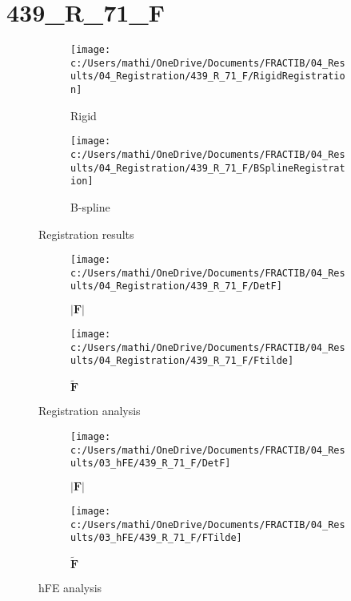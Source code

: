 \documentclass{article}%
\begin{document}
%
\newpage%
\section*{439\_R\_71\_F}%
\label{sec:439R71F}%


\begin{figure}[h!]%
\begin{subfigure}[b]{0.5\linewidth}%
\texttt{[image: c:/Users/mathi/OneDrive/Documents/FRACTIB/04\_Results/04\_Registration/439\_R\_71\_F/RigidRegistration]}%
\caption{Rigid}%
\end{subfigure}%
\begin{subfigure}[b]{0.5\linewidth}%
\texttt{[image: c:/Users/mathi/OneDrive/Documents/FRACTIB/04\_Results/04\_Registration/439\_R\_71\_F/BSplineRegistration]}%
\caption{B{-}spline}%
\end{subfigure}%
\caption{Registration results}%
\end{figure}

%


\begin{figure}[h!]%
\begin{subfigure}[b]{0.5\linewidth}%
\texttt{[image: c:/Users/mathi/OneDrive/Documents/FRACTIB/04\_Results/04\_Registration/439\_R\_71\_F/DetF]}%
\caption{$|\mathbf{F}|$}%
\end{subfigure}%
\begin{subfigure}[b]{0.5\linewidth}%
\texttt{[image: c:/Users/mathi/OneDrive/Documents/FRACTIB/04\_Results/04\_Registration/439\_R\_71\_F/Ftilde]}%
\caption{$\tilde{\mathbf{F}}$}%
\end{subfigure}%
\caption{Registration analysis}%
\end{figure}

%


\begin{figure}[h!]%
\begin{subfigure}[b]{0.5\linewidth}%
\texttt{[image: c:/Users/mathi/OneDrive/Documents/FRACTIB/04\_Results/03\_hFE/439\_R\_71\_F/DetF]}%
\caption{$|\mathbf{F}|$}%
\end{subfigure}%
\begin{subfigure}[b]{0.5\linewidth}%
\texttt{[image: c:/Users/mathi/OneDrive/Documents/FRACTIB/04\_Results/03\_hFE/439\_R\_71\_F/FTilde]}%
\caption{$\tilde{\mathbf{F}}$}%
\end{subfigure}%
\caption{hFE analysis}%
\end{figure}
\end{document}
